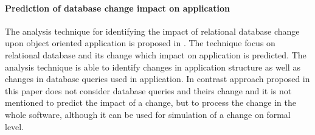 \documentclass[11pt]{article}
\begin{document}
\paragraph{Prediction of database change impact on application}The analysis technique for identifying the impact of relational database change upon object oriented application is proposed in \cite{Maule:ImpactAnalysis}. The technique focus on relational database and its change which impact on application is predicted. The analysis technique is able to identify changes in application structure as well as changes in database queries used in application. In contrast approach proposed in this paper does not consider database queries and theirs change and it is not mentioned to predict the impact of a change, but to  
process the change in the whole software, although it can be used for simulation of a change on formal level.



\end{document}
